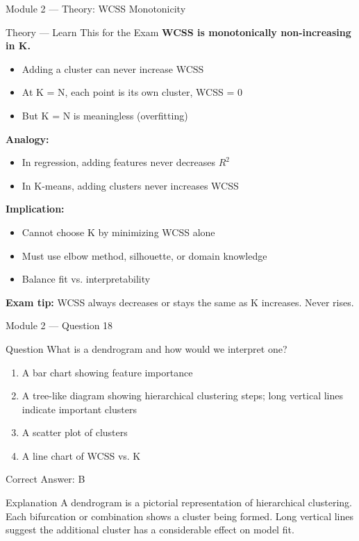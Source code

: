 \documentclass[aspectratio=169,10pt]{beamer}
\newcommand{\question}[1]{%
	\begin{block}{Question}
		#1
	\end{block}
}
\newcommand{\options}[4]{%
	\begin{enumerate}[label=\Alph*.,leftmargin=*]
		\item #1
		\item #2
		\item #3
		\item #4
	\end{enumerate}
}
\newcommand{\answerbox}[1]{%
	\begin{exampleblock}{Correct Answer: #1}
	\end{exampleblock}
}
\newcommand{\explain}[1]{%
	\begin{block}{Explanation}
		\small #1
	\end{block}
}
\newcommand{\theory}[1]{%
	\begin{block}{Theory --- Learn This for the Exam}
		\small #1
	\end{block}
}
\begin{document}
	\begin{frame}{Module 2 --- Theory: WCSS Monotonicity}
		\theory{
			\textbf{WCSS is monotonically non-increasing in K.}
			\begin{itemize}
				\item Adding a cluster can never increase WCSS
				\item At K = N, each point is its own cluster, WCSS = 0
				\item But K = N is meaningless (overfitting)
			\end{itemize}
			\textbf{Analogy:}
			\begin{itemize}
				\item In regression, adding features never decreases $R^2$
				\item In K-means, adding clusters never increases WCSS
			\end{itemize}
			\textbf{Implication:}
			\begin{itemize}
				\item Cannot choose K by minimizing WCSS alone
				\item Must use elbow method, silhouette, or domain knowledge
				\item Balance fit vs. interpretability
			\end{itemize}
			\textbf{Exam tip:} WCSS always decreases or stays the same as K increases. Never rises.
		}
	\end{frame}
	
	\begin{frame}{Module 2 --- Question 18}
		\question{What is a dendrogram and how would we interpret one?}
		\options{A bar chart showing feature importance}{A tree-like diagram showing hierarchical clustering steps; long vertical lines indicate important clusters}{A scatter plot of clusters}{A line chart of WCSS vs. K}
		\answerbox{B}
		\explain{A dendrogram is a pictorial representation of hierarchical clustering. Each bifurcation or combination shows a cluster being formed. Long vertical lines suggest the additional cluster has a considerable effect on model fit.}
	\end{frame}
	
\end{document}

